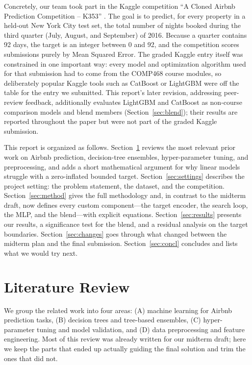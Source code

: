 \documentclass[journal]{IEEEtran}
\begin{document}
Concretely, our team took part in the Kaggle competition ``A Cloned Airbnb
Prediction Competition -- K353'' \cite{k353comp}. The goal is to predict, for
every property in a held-out New York City test set, the total number of nights
booked during the third quarter (July, August, and September) of 2016. Because
a quarter contains 92 days, the target is an integer between 0 and 92, and the
competition scores submissions purely by Mean Squared Error. The graded Kaggle
entry itself was constrained in one important way: every model and optimization
algorithm used for that submission had to come from the COMP468 course modules,
so deliberately popular Kaggle tools such as CatBoost or LightGBM were off the
table for the entry we submitted. This report's later revision, addressing
peer-review feedback, additionally evaluates LightGBM and CatBoost as
non-course comparison models and blend members (Section~\ref{sec:blend}); their
results are reported throughout the paper but were not part of the graded
Kaggle submission.

This report is organized as follows. Section~\ref{sec:lit} reviews the most
relevant prior work on Airbnb prediction, decision-tree ensembles,
hyper-parameter tuning, and preprocessing, and adds a short mathematical
argument for why linear models struggle with a zero-inflated bounded target.
Section~\ref{sec:settings} describes the project setting: the problem statement,
the dataset, and the competition. Section~\ref{sec:method} gives the full
methodology and, in contrast to the midterm draft, now defines every custom
component---the target encoder, the search loop, the MLP, and the blend---with
explicit equations. Section~\ref{sec:results} presents our results, a
significance test for the blend, and a residual analysis on the target
boundaries. Section~\ref{sec:changes} goes through what changed between the
midterm plan and the final submission. Section~\ref{sec:concl} concludes and
lists what we would try next.

\section{Literature Review}
\label{sec:lit}
We group the related work into four areas: (A) machine learning for Airbnb
prediction tasks, (B) decision trees and tree-based ensembles, (C)
hyper-parameter tuning and model validation, and (D) data preprocessing and
feature engineering. Most of this review was already written for our midterm
draft; here we keep the parts that ended up actually guiding the final solution
and trim the ones that did not.
\end{document}
